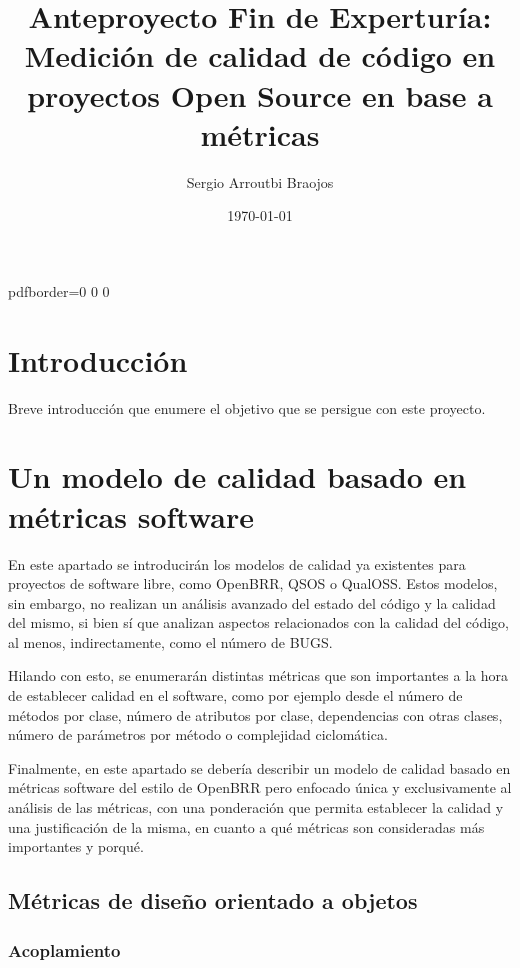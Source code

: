 \documentclass[11pt]{article}
\title{\textbf{Anteproyecto Fin de Experturía: Medición de calidad de código en proyectos Open Source en
base a métricas}}
\author{Sergio Arroutbi Braojos}
\date{\today}
\begin{document}
\hypersetup
{   
pdfborder={0 0 0}
}
   
\maketitle

\pagebreak

\tableofcontents

\pagebreak

\section{Introducción}

Breve introducción que enumere el objetivo que se persigue con este proyecto.

\section{Un modelo de calidad basado en métricas software}

En este apartado se introducirán los modelos de calidad ya existentes para proyectos de software libre, como OpenBRR, QSOS o QualOSS. Estos modelos, sin embargo, no realizan un análisis avanzado del estado del código y la calidad del mismo, si bien sí que analizan aspectos relacionados con la calidad del código, al menos, indirectamente, como el número de BUGS.

Hilando con esto, se enumerarán distintas métricas que son importantes a la hora de establecer calidad en el software, como por ejemplo desde el número de métodos por clase, número de atributos por clase, dependencias con otras clases, número de parámetros por método o complejidad ciclomática.

Finalmente, en este apartado se debería describir un modelo de calidad basado en métricas software del estilo de OpenBRR pero enfocado única y exclusivamente al análisis de las métricas, con una ponderación que permita establecer la calidad y una justificación de la misma, en cuanto a qué métricas son consideradas más importantes y porqué.

\subsection{Métricas de diseño orientado a objetos}

\subsubsection{Acoplamiento}
\end{document}
